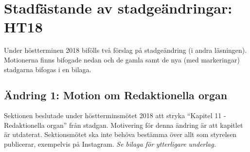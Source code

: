 \documentclass[10pt]{article}
\begin{document}
\newpage

\section*{Stadfästande av stadgeändringar: HT18}
Under höstterminen 2018 bifölls två förslag på stadgeändring (i andra läsningen). Motionerna finns bifogade nedan och de gamla samt de nya (med markeringar) stadgarna bifogas i en bilaga.

\subsection*{Ändring 1: Motion om Redaktionella organ}
Sektionen beslutade under höstterminsmötet 2018 att stryka ``Kapitel 11 - Redaktionella organ'' från stadgan. Motivering för denna ändring är att kapitlet är utdaterat. Sektionsmötet ska inte behöva bestämma över allt som styrelsen publicerar, exempelvis på Instagram. \textit{Se bilaga för ytterligare underlag.}  
\end{document}
